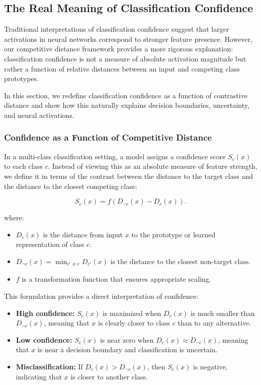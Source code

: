 \subsection{The Real Meaning of Classification Confidence}

Traditional interpretations of classification confidence suggest that larger activations in neural networks correspond to stronger feature presence. However, our competitive distance framework provides a more rigorous explanation: classification confidence is not a measure of absolute activation magnitude but rather a function of relative distances between an input and competing class prototypes. 

In this section, we redefine classification confidence as a function of contrastive distance and show how this naturally explains decision boundaries, uncertainty, and neural activations.

\subsubsection{Confidence as a Function of Competitive Distance}

In a multi-class classification setting, a model assigns a confidence score \( S_c(x) \) to each class \( c \). Instead of viewing this as an absolute measure of feature strength, we define it in terms of the contrast between the distance to the target class and the distance to the closest competing class:

\[
S_c(x) = f(D_{\neg c}(x) - D_c(x)).
\]

where:

\begin{itemize}
    \item \( D_c(x) \) is the distance from input \( x \) to the prototype or learned representation of class \( c \).
    \item \( D_{\neg c}(x) = \min_{c' \neq c} D_{c'}(x) \) is the distance to the closest non-target class.
    \item \( f \) is a transformation function that ensures appropriate scaling.
\end{itemize}

This formulation provides a direct interpretation of confidence:

\begin{itemize}
    \item \textbf{High confidence:} \( S_c(x) \) is maximized when \( D_c(x) \) is much smaller than \( D_{\neg c}(x) \), meaning that \( x \) is clearly closer to class \( c \) than to any alternative.
    \item \textbf{Low confidence:} \( S_c(x) \) is near zero when \( D_c(x) \approx D_{\neg c}(x) \), meaning that \( x \) is near a decision boundary and classification is uncertain.
    \item \textbf{Misclassification:} If \( D_c(x) > D_{\neg c}(x) \), then \( S_c(x) \) is negative, indicating that \( x \) is closer to another class.
\end{itemize}

